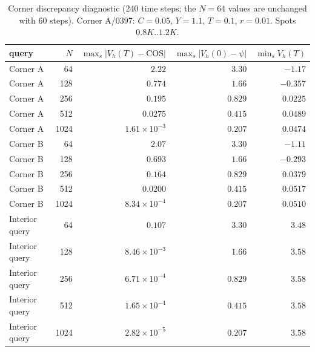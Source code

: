 \begin{table}[!htbp]
\centering\small
\caption{Corner discrepancy diagnostic (240 time steps; the $N=64$ values are unchanged with 60 steps). Corner A/0397: $C=0.05$, $Y=1.1$, $T=0.1$, $r=0.01$. Spots $0.8K..1.2K$.}
\label{tab:corner}
\begin{tabular}{lrrrr}
\toprule
query & $N$ & $\max_s|V_h(T)-\mathrm{COS}|$ & $\max_s|V_h(0)-\psi|$ & $\min_s V_h(T)$\\
\midrule
Corner A & 64 & $2.22$ & $3.30$ & $-1.17$\\
Corner A & 128 & $0.774$ & $1.66$ & $-0.357$\\
Corner A & 256 & $0.195$ & $0.829$ & $0.0225$\\
Corner A & 512 & $0.0275$ & $0.415$ & $0.0489$\\
Corner A & 1024 & $1.61\times10^{-3}$ & $0.207$ & $0.0474$\\
Corner B & 64 & $2.07$ & $3.30$ & $-1.11$\\
Corner B & 128 & $0.693$ & $1.66$ & $-0.293$\\
Corner B & 256 & $0.164$ & $0.829$ & $0.0379$\\
Corner B & 512 & $0.0200$ & $0.415$ & $0.0517$\\
Corner B & 1024 & $8.34\times10^{-4}$ & $0.207$ & $0.0510$\\
Interior query & 64 & $0.107$ & $3.30$ & $3.48$\\
Interior query & 128 & $8.46\times10^{-3}$ & $1.66$ & $3.58$\\
Interior query & 256 & $6.71\times10^{-4}$ & $0.829$ & $3.58$\\
Interior query & 512 & $1.65\times10^{-4}$ & $0.415$ & $3.58$\\
Interior query & 1024 & $2.82\times10^{-5}$ & $0.207$ & $3.58$\\
\bottomrule
\end{tabular}
\end{table}
